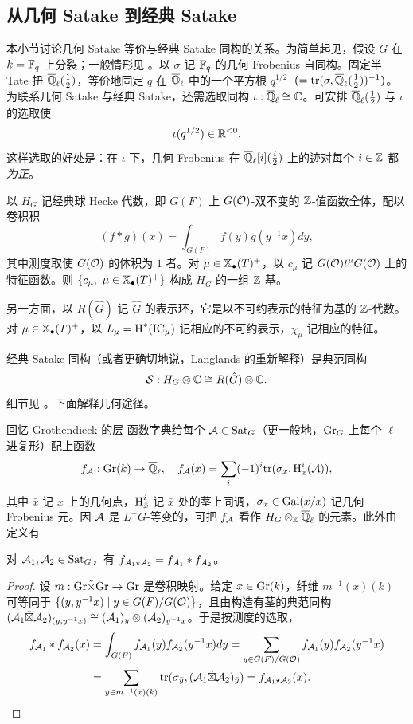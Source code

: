 
\subsection{从几何 Satake 到经典 Satake}\label{applications of sat}

本小节讨论几何 Satake 等价与经典 Satake 同构的关系。为简单起见，假设 $G$ 在 $k={\mathbb F}_q$ 上分裂；一般情形见 \cite{RZ}。以 $\sigma$ 记 ${\mathbb F}_q$ 的几何 Frobenius 自同构。固定半 Tate 扭 ${\overline{{\mathbb Q}}_\ell}(\frac{1}{2})$，等价地固定 $q$ 在 ${\overline{{\mathbb Q}}_\ell}$ 中的一个平方根 $q^{1/2}$（$={\operatorname{tr}}(\sigma,{\overline{{\mathbb Q}}_\ell}(\frac{1}{2}))^{-1}$）。为联系几何 Satake 与经典 Satake，还需选取同构 $\iota:{\overline{{\mathbb Q}}_\ell}\cong {\mathbb C}$。可安排 ${\overline{{\mathbb Q}}_\ell}(\frac{1}{2})$ 与 $\iota$ 的选取使
\[\iota(q^{1/2})\in {\mathbb R}^{<0}.\]
这样选取的好处是：在 $\iota$ 下，几何 Frobenius 在 ${\overline{{\mathbb Q}}_\ell}[i](\frac{i}{2})$ 上的迹对每个 $i\in {\mathbb Z}$ 都\emph{为正}。

以 $H_G$ 记经典球 Hecke 代数，即 $G(F)$ 上 $G({\mathcal O})$-双不变的 ${\mathbb Z}$-值函数全体，配以卷积积
\[(f*g)(x)=\int_{G(F)}f(y)g(y^{-1}x)dy,\]
其中测度取使 $G({\mathcal O})$ 的体积为 $1$ 者。对 $\mu\in \mathbb{X}_\bullet(T)^+$，以 $c_\mu$ 记 $G({\mathcal O})t^\mu G({\mathcal O})$ 上的特征函数。则 $\{c_\mu,\ \mu\in\xcoch(T)^+\}$ 构成 $H_G$ 的一组 ${\mathbb Z}$-基。

另一方面，以 $R(\hat G)$ 记 $\hat G$ 的表示环，它是以不可约表示的特征为基的 ${\mathbb Z}$-代数。对 $\mu\in \mathbb{X}_\bullet(T)^+$，以 $L_\mu=\operatorname{H}^*({\operatorname{IC}}_\mu)$ 记相应的不可约表示，$\chi_\mu$ 记相应的特征。

经典 Satake 同构（或者更确切地说，Langlands 的重新解释）是典范同构
\[{\mathcal S}: H_G\otimes{\mathbb C}\cong R(\hat G)\otimes{\mathbb C}.\]
细节见 \cite{Gr}。下面解释几何途径。

回忆 Grothendieck 的层-函数字典给每个 ${\mathcal A}\in {\operatorname{Sat}}_G$（更一般地，${\operatorname{Gr}}_G$ 上每个 $\ell$-进复形）配上函数
\[f_{\mathcal A}: {\operatorname{Gr}}(k)\to {\overline{{\mathbb Q}}_\ell},\quad f_{\mathcal A}(x)=\sum_i(-1)^i{\operatorname{tr}}(\sigma_x, \operatorname{H}^i_{\bar x}({\mathcal A})),\]
其中 $\bar x$ 记 $x$ 上的几何点，$\operatorname{H}^i_{\bar x}$ 记 $\bar x$ 处的茎上同调，$\sigma_x\in {\operatorname{Gal}}(\bar x/x)$ 记几何 Frobenius 元。因 ${\mathcal A}$ 是 $L^+G$-等变的，可把 $f_{\mathcal A}$ 看作 $H_G\otimes_{\mathbb Z}{\overline{{\mathbb Q}}_\ell}$ 的元素。此外由定义有

\begin{lem}\label{conv vs classical conv}
对 ${\mathcal A}_1,{\mathcal A}_2\in{\operatorname{Sat}}_G$，有 $f_{{\mathcal A}_1\star{\mathcal A}_2}=f_{{\mathcal A}_1}*f_{{\mathcal A}_2}$。
\end{lem}

\begin{proof}
设 $m:{\operatorname{Gr}}\tilde\times{\operatorname{Gr}}\to {\operatorname{Gr}}$ 是卷积映射。给定 $x\in {\operatorname{Gr}}(k)$，纤维 $m^{-1}(x)(k)$ 可等同于 $\{(y, y^{-1}x)\mid y\in G(F)/G({\mathcal O})\}$，且由构造有茎的典范同构 $({\mathcal A}_1\tilde\boxtimes{\mathcal A}_2)_{(y,y^{-1}x)}\cong ({\mathcal A}_1)_y\otimes({\mathcal A}_2)_{y^{-1}x}$。于是按测度的选取，
\[\begin{split}
f_{{\mathcal A}_1}*f_{{\mathcal A}_2}(x)&=\int_{G(F)}f_{{\mathcal A}_1}(y)f_{{\mathcal A}_2}(y^{-1}x)dy=\sum_{y\in G(F)/G({\mathcal O})}f_{{\mathcal A}_1}(y)f_{{\mathcal A}_2}(y^{-1}x)\\
&=\sum_{y\in m^{-1}(x)(k)} {\operatorname{tr}}(\sigma_{\bar y}, ({\mathcal A}_1\tilde\boxtimes{\mathcal A}_2)_{\bar y})=f_{{\mathcal A}_1\star{\mathcal A}_2}(x).
\end{split}\]
\end{proof}

